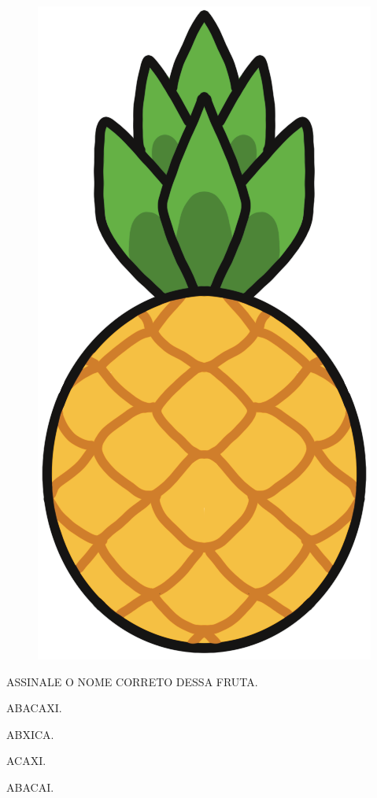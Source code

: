\begin{minipage}{.2\textwidth}
\begin{figure}[H]
\includegraphics[width=\textwidth]{media/image192.png}
\end{figure}
\end{minipage}
\hspace{1cm}
\begin{minipage}{.8\textwidth}
ASSINALE O NOME CORRETO DESSA FRUTA.

\begin{escolha}
\item ABACAXI.

\item ABXICA.

\item ACAXI.

\item ABACAI.
\end{escolha}
\end{minipage}

